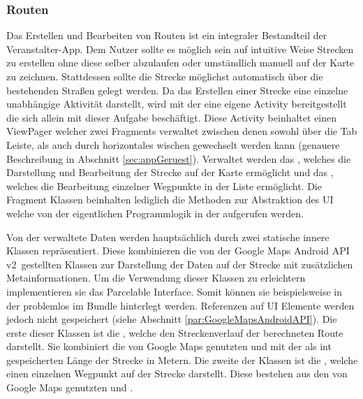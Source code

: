 \subsubsection{Routen}
Das Erstellen und Bearbeiten von Routen ist ein integraler Bestandteil der Veranstalter-App. Dem Nutzer sollte es möglich sein auf intuitive Weise Strecken zu erstellen ohne diese selber abzulaufen oder umständlich manuell auf der Karte zu zeichnen. Stattdessen sollte die Strecke möglichst automatisch über die bestehenden Straßen gelegt werden. Da das Erstellen einer Strecke eine einzelne unabhängige Aktivität darstellt, wird mit der  eine eigene Activity bereitgestellt die sich allein mit dieser Aufgabe beschäftigt. Diese Activity beinhaltet einen ViewPager welcher zwei Fragments verwaltet zwischen denen sowohl über die Tab Leiste, als auch durch horizontales wischen gewechselt werden kann (genauere Beschreibung in Abschnitt \ref{sec:appGeruest}). Verwaltet werden das , welches die Darstellung und Bearbeitung der Strecke auf der Karte ermöglicht und das , welches die Bearbeitung einzelner Wegpunkte in der Liste ermöglicht. Die Fragment Klassen beinhalten lediglich die Methoden zur Abstraktion des UI welche von der eigentlichen Programmlogik in der  aufgerufen werden.

Von der  verwaltete Daten werden hauptsächlich durch zwei statische innere Klassen repräsentiert. Diese kombinieren die von der \glqq Google Maps Android API v2\grqq\ gestellten Klassen zur Darstellung der Daten auf der Strecke mit zusätzlichen Metainformationen. Um die Verwendung dieser Klassen zu erleichtern implementieren sie das Parcelable Interface. Somit können sie beispielsweise in der  problemlos im Bundle hinterlegt werden. Referenzen auf UI Elemente werden jedoch nicht gespeichert (siehe Abschnitt \ref{par:GoogleMapsAndroidAPI}). Die erste dieser Klassen ist die , welche den Streckenverlauf der berechneten Route darstellt. Sie kombiniert die von Google Maps genutzten  und  mit der als int gespeicherten Länge der Strecke in Metern. Die zweite der Klassen ist die , welche einen einzelnen Wegpunkt auf der Strecke darstellt. Diese bestehen aus den von Google Maps genutzten  und .


